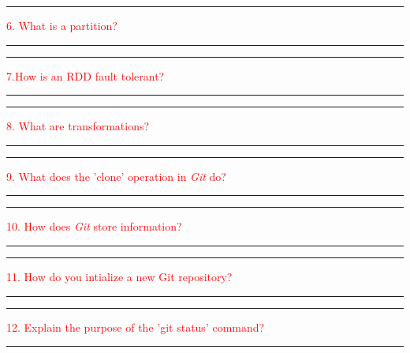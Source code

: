 \documentclass{article}
\begin{document}
\noindent
{\color{red} \rule{\linewidth}{0.5mm}}
\textcolor{red}{6. What is a partition?} \\
\noindent
{\color{red} \rule{\linewidth}{0.5mm}}

\noindent
{\color{red} \rule{\linewidth}{0.5mm}}
\textcolor{red}{7.How is an RDD fault tolerant?} \\
\noindent
{\color{red} \rule{\linewidth}{0.5mm}}



\noindent
{\color{red} \rule{\linewidth}{0.5mm}}
\textcolor{red}{8. What are transformations?} \\
\noindent
{\color{red} \rule{\linewidth}{0.5mm}}

\noindent
{\color{red} \rule{\linewidth}{0.5mm}}
\textcolor{red}{9. What does the 'clone' operation in \textit{Git} do?} \\
\noindent
{\color{red} \rule{\linewidth}{0.5mm}}

\noindent
{\color{red} \rule{\linewidth}{0.5mm}}
\textcolor{red}{10. How does \textit{Git} store information?} \\
\noindent
{\color{red} \rule{\linewidth}{0.5mm}}


\noindent
{\color{red} \rule{\linewidth}{0.5mm}}
\textcolor{red}{11. How do you intialize a new Git repository?} \\
\noindent
{\color{red} \rule{\linewidth}{0.5mm}}

\noindent
{\color{red} \rule{\linewidth}{0.5mm}}
\textcolor{red}{12. Explain the purpose of the 'git status' command?} \\
\noindent
{\color{red} \rule{\linewidth}{0.5mm}}
\end{document}
